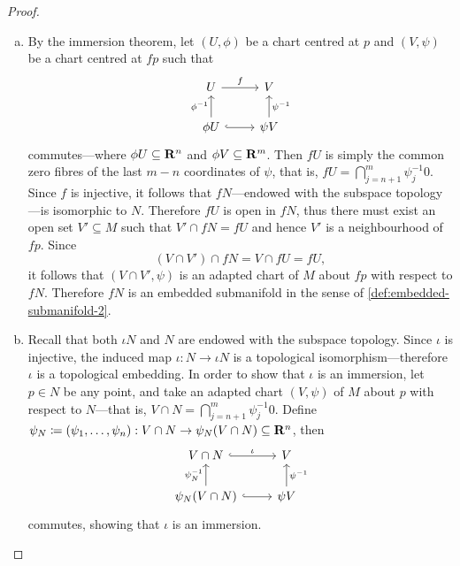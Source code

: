 \begin{proof}
    \begin{enumerate}[(a)]\setlength\itemsep{0em}
        \item By the immersion theorem, let \((U, \phi)\) be a chart centred at \(p\)
              and \((V, \psi)\) be a chart centred at \(f p\) such that
              \[
                  \begin{tikzcd}
                      U \ar[r, "f"] &V \\
                      \phi U \ar[u, "\phi^{-1}"] \ar[r, hook] &\psi V \ar[u, "\psi^{-1}"']
                  \end{tikzcd}
              \]
              commutes---where \(\phi U \subseteq \mathbf{R}^n\) and \(\phi V \subseteq \mathbf{R}^m\). Then
              \(f U\) is simply the common zero fibres of the last \(m-n\) coordinates of
              \(\psi\), that is, \(f U = \bigcap_{j=n+1}^m \psi_j^{-1} 0\). Since \(f\) is
              injective, it follows that \(f N\)---endowed with the subspace topology---is
              isomorphic to \(N\). Therefore \(f U\) is open in \(f N\), thus there must
              exist an open set \(V' \subseteq M\) such that \(V' \cap f N = f U\) and hence
              \(V'\) is a neighbourhood of \(f p\). Since
              \[
                  (V \cap V') \cap f N = V \cap f U = f U,
              \]
              it follows that \((V \cap V', \psi)\) is an adapted chart of \(M\) about \(f
              p\) with respect to \(f N\). Therefore \(f N\) is an embedded submanifold in
              the sense of \cref{def:embedded-submanifold-2}.

        \item Recall that both \(\iota N\) and \(N\) are endowed with the subspace
              topology. Since \(\iota\) is injective, the induced map
              \(\iota: N \to \iota N\) is a topological isomorphism---therefore \(\iota\) is
              a topological embedding. In order to show that \(\iota\) is an immersion, let
              \(p \in N\) be any point, and take an adapted chart \((V, \psi)\) of \(M\)
              about \(p\) with respect to \(N\)---that is,
              \(V \cap N = \bigcap_{j=n+1}^m \psi_j^{-1} 0\). Define \(\psi_N \coloneq
              (\psi_1, \dots, \psi_n): V \cap N \to \psi_N(V \cap N) \subseteq \mathbf{R}^n\), then
              \[
                  \begin{tikzcd}
                      V \cap N \ar[r, hook, "\iota"] &V \\
                      \psi_N(V \cap N) \ar[u, "\psi_N^{-1}"] \ar[r, hook]
                      &\psi V \ar[u, "\psi^{-1}"']
                  \end{tikzcd}
              \]
              commutes, showing that \(\iota\) is an immersion.
    \end{enumerate}
\end{proof}

